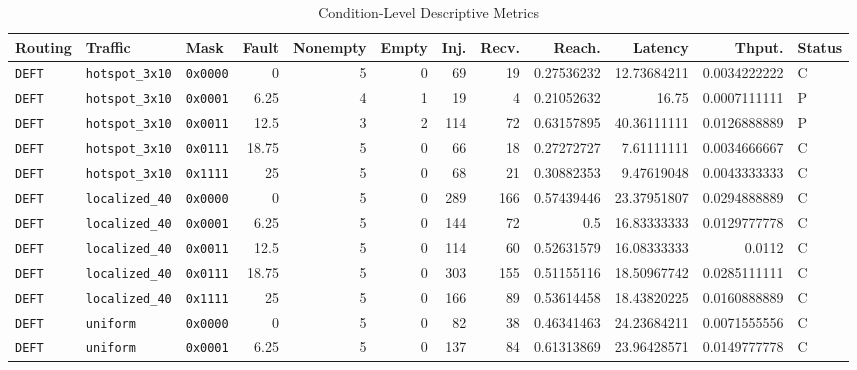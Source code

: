 \documentclass[conference]{IEEEtran}
\begin{document}
\begin{table}[t]
\centering
\caption{Condition-Level Descriptive Metrics}
\label{tab:condition_metrics}
\scriptsize
\setlength{\tabcolsep}{3pt}
\begin{adjustbox}{max width=\textwidth}
\begin{tabular}{@{}lllrrrrrrrrl@{}}
\toprule
\textbf{Routing} & \textbf{Traffic} & \textbf{Mask} & \textbf{Fault} & \textbf{Nonempty} & \textbf{Empty} & \textbf{Inj.} & \textbf{Recv.} & \textbf{Reach.} & \textbf{Latency} & \textbf{Thput.} & \textbf{Status} \\
\midrule
\texttt{DEFT} & \texttt{hotspot\_3x10} & \texttt{0x0000} & 0 & 5 & 0 & 69 & 19 & 0.27536232 & 12.73684211 & 0.0034222222 & C \\
\texttt{DEFT} & \texttt{hotspot\_3x10} & \texttt{0x0001} & 6.25 & 4 & 1 & 19 & 4 & 0.21052632 & 16.75 & 0.0007111111 & P \\
\texttt{DEFT} & \texttt{hotspot\_3x10} & \texttt{0x0011} & 12.5 & 3 & 2 & 114 & 72 & 0.63157895 & 40.36111111 & 0.0126888889 & P \\
\texttt{DEFT} & \texttt{hotspot\_3x10} & \texttt{0x0111} & 18.75 & 5 & 0 & 66 & 18 & 0.27272727 & 7.61111111 & 0.0034666667 & C \\
\texttt{DEFT} & \texttt{hotspot\_3x10} & \texttt{0x1111} & 25 & 5 & 0 & 68 & 21 & 0.30882353 & 9.47619048 & 0.0043333333 & C \\
\texttt{DEFT} & \texttt{localized\_40} & \texttt{0x0000} & 0 & 5 & 0 & 289 & 166 & 0.57439446 & 23.37951807 & 0.0294888889 & C \\
\texttt{DEFT} & \texttt{localized\_40} & \texttt{0x0001} & 6.25 & 5 & 0 & 144 & 72 & 0.5 & 16.83333333 & 0.0129777778 & C \\
\texttt{DEFT} & \texttt{localized\_40} & \texttt{0x0011} & 12.5 & 5 & 0 & 114 & 60 & 0.52631579 & 16.08333333 & 0.0112 & C \\
\texttt{DEFT} & \texttt{localized\_40} & \texttt{0x0111} & 18.75 & 5 & 0 & 303 & 155 & 0.51155116 & 18.50967742 & 0.0285111111 & C \\
\texttt{DEFT} & \texttt{localized\_40} & \texttt{0x1111} & 25 & 5 & 0 & 166 & 89 & 0.53614458 & 18.43820225 & 0.0160888889 & C \\
\texttt{DEFT} & \texttt{uniform} & \texttt{0x0000} & 0 & 5 & 0 & 82 & 38 & 0.46341463 & 24.23684211 & 0.0071555556 & C \\
\texttt{DEFT} & \texttt{uniform} & \texttt{0x0001} & 6.25 & 5 & 0 & 137 & 84 & 0.61313869 & 23.96428571 & 0.0149777778 & C \\

\end{tabular}
\end{adjustbox}
\end{table}
\end{document}
